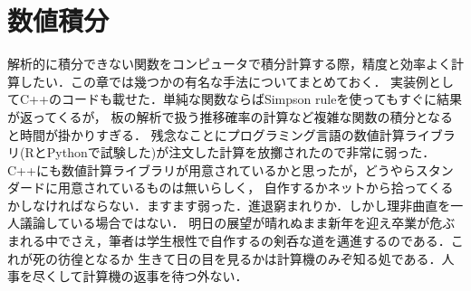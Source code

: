 \documentclass[a4j,papersize,disablejfam,slide,14pt]{jsarticle}
\begin{document}
\section{数値積分}
	解析的に積分できない関数をコンピュータで積分計算する際，精度と効率よく計算したい．この章では幾つかの有名な手法についてまとめておく．
    実装例として{\rm C++}のコードも載せた．単純な関数ならば{\rm Simpson rule}を使ってもすぐに結果が返ってくるが，
    板の解析で扱う推移確率の計算など複雑な関数の積分となると時間が掛かりすぎる．
    残念なことにプログラミング言語の数値計算ライブラリ({\rm R}と{\rm Python}で試験した)が注文した計算を放擲されたので非常に弱った．
    {\rm C++}にも数値計算ライブラリが用意されているかと思ったが，どうやらスタンダードに用意されているものは無いらしく，
    自作するかネットから拾ってくるかしなければならない．ますます弱った．進退窮まれりか．しかし理非曲直を一人議論している場合ではない．
    明日の展望が晴れぬまま新年を迎え卒業が危ぶまれる中でさえ，筆者は学生根性で自作するの剣呑な道を邁進するのである．これが死の彷徨となるか
    生きて日の目を見るかは計算機のみぞ知る処である．人事を尽くして計算機の返事を待つ外ない．
    
\end{document}
